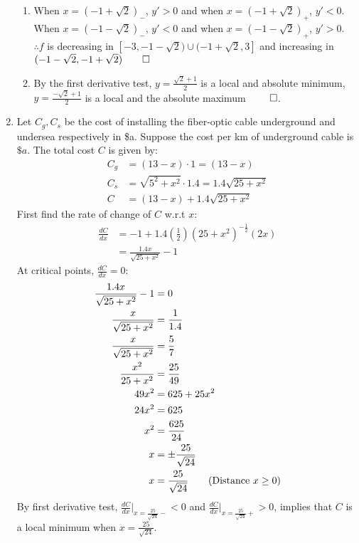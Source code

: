 \documentclass[12pt, a4paper]{article}
\begin{document}
\begin{enumerate}[Q\arabic*.]
\begin{enumerate}[(\roman*)]
    \item When $x = (-1+\sqrt{2})_-$, $y' > 0$ and when $x = (-1+\sqrt{2})_+$, $y' < 0$. \\
    When $x = (-1-\sqrt{2})_-$, $y' < 0$ and when $x = (-1-\sqrt{2})_+$, $y' > 0$. \\
    $\therefore f$ is decreasing in $[-3, -1-\sqrt{2}) \cup (-1+\sqrt{2}, 3]$ and increasing in $(-1-\sqrt{2}, -1+\sqrt{2}) \qed$ 

  \item By the first derivative test, $\displaystyle y = \frac{\sqrt{2}+1}{2}$ is a local and absolute minimum, $\displaystyle y = \frac{-\sqrt{2}+1}{2}$ is a local and the absolute maximum $\qed$.
    \end{enumerate}

  \item Let $C_g, C_s$ be the cost of installing the fiber-optic cable underground and undersea respectively in \$a. Suppose the cost per km of underground cable is $\$a$. The total cost $C$ is given by:
    \begin{align*}
      C_g &= (13-x)\cdot 1 = (13-x)\\
      C_s &= \sqrt{5^2+x^2}\cdot1.4 = 1.4\sqrt{25+x^2}\\
      C &= (13-x) + 1.4\sqrt{25+x^2}
    \end{align*}
    First find the rate of change of $C$ w.r.t $x$:
    \begin{align*}
      \frac{dC}{dx} &= -1 + 1.4(\frac{1}{2})(25+x^2)^{-\frac{1}{2}}(2x)\\
                    &= \frac{1.4x}{\sqrt{25+x^2}}-1
    \end{align*}
    At critical points, $\frac{dC}{dx} = 0$:
    \begin{align*}
      \frac{1.4x}{\sqrt{25+x^2}} - 1 &= 0\\
      \frac{x}{\sqrt{25+x^2}} &= \frac{1}{1.4}\\
      \frac{x}{\sqrt{25+x^2}} &= \frac{5}{7}\\
      \frac{x^2}{25+x^2} &= \frac{25}{49}\\
      49x^2 &= 625 + 25x^2\\
      24x^2 &= 625\\
      x^2 &= \frac{625}{24}\\
      x &= \pm \frac{25}{\sqrt{24}}\\
      x &= \frac{25}{\sqrt{24}}\tag*{\text{(Distance $x \geq 0$)}}
    \end{align*}
    By first derivative test, $\frac{dC}{dx}|_{x=\frac{25}{\sqrt{24}}-} < 0$ and $\frac{dC}{dx}|_{x=\frac{25}{\sqrt{24}}+} > 0$, implies that $C$ is a local minimum when $x = \frac{25}{\sqrt{24}}$.\\

\end{enumerate}
\end{document}
